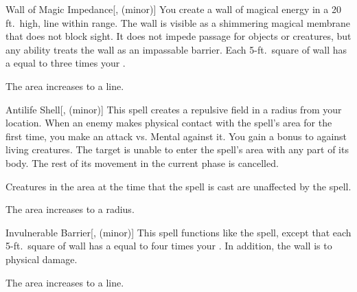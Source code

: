 \lowercase{\hypertarget{spell:Wall of Magic Impedance}{}}\label{spell:Wall of Magic Impedance}
\begin{freeability}[Rank 5]{\hypertarget{spell:Wall of Magic Impedance}{Wall of Magic Impedance}}[,  (minor)]
\targetrule
You create a wall of magical energy in a 20 ft.\ high, \areamed line within \rngmed range.
The wall is visible as a shimmering magical membrane that does not block sight.
It does not impede passage for objects or creatures, but any  ability treats the wall as an impassable barrier.
Each 5-ft.\ square of wall has a  equal to three times your .

\rankline
{} The area increases to a \arealarge line.
\end{freeability}
\vspace{0.25em}



\lowercase{\hypertarget{spell:Antilife Shell}{}}\label{spell:Antilife Shell}
\begin{freeability}[Rank 6]{\hypertarget{spell:Antilife Shell}{Antilife Shell}}[,  (minor)]
This spell creates a repulsive field in a \areamed radius  from your location.
When an enemy makes physical contact with the spell's area for the first time, you make an attack vs. Mental against it.
You gain a  bonus to  against living creatures.
\hit The target is unable to enter the spell's area with any part of its body.
The rest of its movement in the current phase is cancelled.

Creatures in the area at the time that the spell is cast are unaffected by the spell.

\rankline
{} The area increases to a \arealarge radius.
\end{freeability}
\vspace{0.25em}



\lowercase{\hypertarget{spell:Invulnerable Barrier}{}}\label{spell:Invulnerable Barrier}
\begin{freeability}[Rank 6]{\hypertarget{spell:Invulnerable Barrier}{Invulnerable Barrier}}[,  (minor)]
\targetrule
This spell functions like the  spell, except that each 5-ft.\ square of wall has a  equal to four times your .
In addition, the wall is  to physical damage.

 The area increases to a \arealarge line.
\end{freeability}
\vspace{0.25em}



